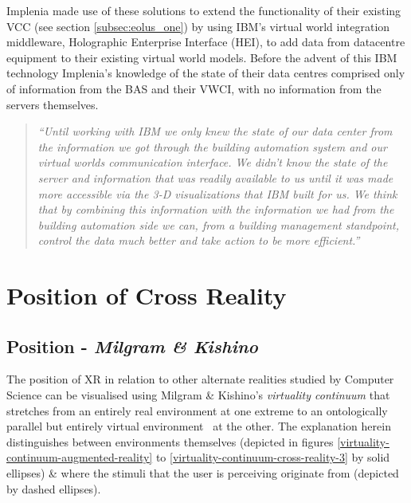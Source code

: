 Implenia made use of these solutions to extend the functionality of their existing VCC (see section \ref{subsec:eolus_one}) by using IBM's virtual world integration middleware, Holographic Enterprise Interface (HEI), to add data from datacentre equipment to their existing virtual world models. Before the advent of this IBM technology Implenia's knowledge of the state of their data centres comprised only of information from the BAS and their VWCI, with no information from the servers themselves.

\begin{quotation}
	\textit{``Until working with IBM we only knew the state of our data center from the information we got through the building automation system and our virtual worlds communication interface. We didn't know the state of the server and information that was readily available to us until it was made more accessible via the 3-D visualizations that IBM built for us. We think that by combining this information with the information we had from the building automation side we can, from a building management standpoint, control the data much better and take action to be more efficient.''}~\cite{Marketwire2008}
\end{quotation}

\section{Position of Cross Reality}

\subsection{Position - \textit{Milgram \& Kishino}}
The position of XR in relation to other alternate realities studied by Computer Science can be visualised using Milgram \& Kishino's \textit{virtuality continuum} that stretches from an entirely real environment at one extreme to an ontologically parallel but entirely virtual environment~\cite{Qvortrup2002} at the other. The explanation herein distinguishes between environments themselves (depicted in figures \ref{virtuality-continuum-augmented-reality} to \ref{virtuality-continuum-cross-reality-3} by solid ellipses) \& where the stimuli that the user is perceiving originate from (depicted by dashed ellipses).


